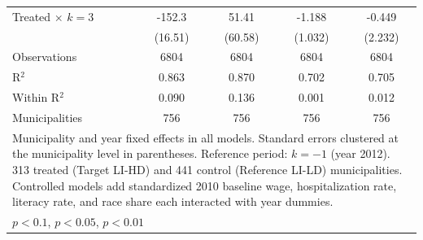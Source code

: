 {\begin{tabular}{l*{4}{c}}
Treated $\times$ $k = 3$&      -152.3\sym{***}&       51.41         &      -1.188         &      -0.449         \\
                    &     (16.51)         &     (60.58)         &     (1.032)         &     (2.232)         \\
\midrule
Observations        &        6804         &        6804         &        6804         &        6804         \\
R$^2$               &       0.863         &       0.870         &       0.702         &       0.705         \\
Within R$^2$        &       0.090         &       0.136         &       0.001         &       0.012         \\
Municipalities      &         756         &         756         &         756         &         756         \\
\bottomrule
\multicolumn{5}{l}{\footnotesize Municipality and year fixed effects in all models. Standard errors clustered at the municipality level in parentheses. Reference period: $k = -1$ (year 2012). 313 treated (Target LI-HD) and 441 control (Reference LI-LD) municipalities. Controlled models add standardized 2010 baseline wage, hospitalization rate, literacy rate, and race share each interacted with year dummies.}\\
\multicolumn{5}{l}{\footnotesize \sym{*} \(p<0.1\), \sym{**} \(p<0.05\), \sym{***} \(p<0.01\)}\\
\end{tabular}
}

